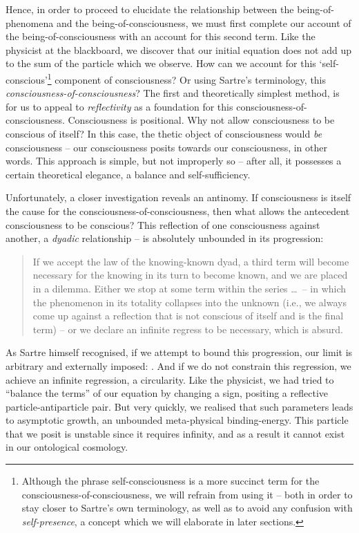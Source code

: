 \noindent
Hence, in order to proceed to elucidate the relationship between the being-of-phenomena and the being-of-consciousness, we must first complete our account of the being-of-consciousness with an account for this second term. Like the physicist at the blackboard, we discover that our initial equation does not add up to the sum of the particle which we observe. How can we account for this \enquote*{self-conscious}\footnote{Although the phrase self-consciousness is a more succinct term for the consciousness-of-consciousness, we will refrain from using it -- both in order to stay closer to Sartre's own terminology, as well as to avoid any confusion with \emph{self-presence}, a concept which we will elaborate in later sections.} component of consciousness? Or using Sartre's terminology, this \emph{consciousness-of-consciousness}? The first and theoretically simplest method, is for us to appeal to \emph{reflectivity} as a foundation for this consciousness-of-consciousness. Consciousness is positional. Why not allow consciousness to be conscious of itself? In this case, the thetic object of consciousness would \emph{be} consciousness -- our consciousness posits towards our consciousness, in other words. This approach is simple, but not improperly so -- after all, it possesses a certain theoretical elegance, a balance and self-sufficiency.

Unfortunately, a closer investigation reveals an antinomy. If consciousness is itself the cause for the consciousness-of-consciousness, then what allows the antecedent consciousness to be conscious? This reflection of one consciousness against another, a \emph{dyadic} relationship -- is absolutely unbounded in its progression:

\blockcquote[11]{Sartre}{
    If we accept the law of the knowing-known dyad, a third term will become necessary for the knowing in its turn to become known, and we are placed in a dilemma. Either we stop at some term within the series \ldots\ -- in which the phenomenon in its totality collapses into the unknown (i.e., we always come up against a reflection that is not conscious of itself and is the final term) -- or we declare an infinite regress to be necessary, which is absurd.
}

\noindent
As Sartre himself recognised, if we attempt to bound this progression, our limit is arbitrary and externally imposed: . And if we do not constrain this regression, we achieve an infinite regression, a circularity. Like the physicist, we had tried to \enquote{balance the terms} of our equation by changing a sign, positing a reflective particle-antiparticle pair. But very quickly, we realised that such parameters leads to asymptotic growth, an unbounded meta-physical binding-energy. This particle that we posit is unstable since it requires infinity, and as a result it cannot exist in our ontological cosmology.

